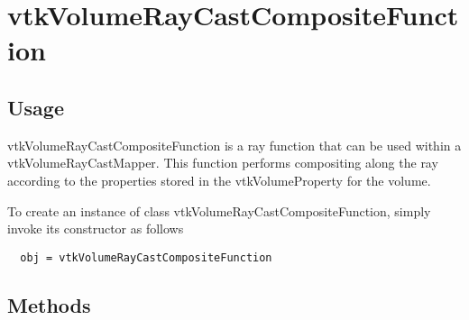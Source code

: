 \section{vtkVolumeRayCastCompositeFunction}

\subsection{Usage}

 vtkVolumeRayCastCompositeFunction is a ray function that can be used
 within a vtkVolumeRayCastMapper. This function performs compositing along
 the ray according to the properties stored in the vtkVolumeProperty for
 the volume. 

To create an instance of class vtkVolumeRayCastCompositeFunction, simply
invoke its constructor as follows
\begin{verbatim}
  obj = vtkVolumeRayCastCompositeFunction
\end{verbatim}
\subsection{Methods}

